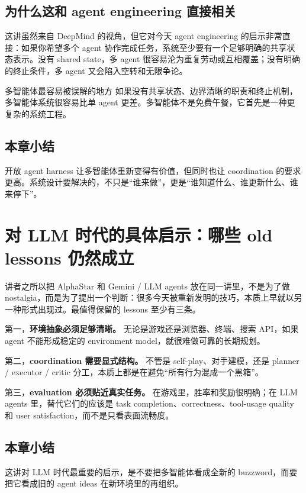 \documentclass[a4paper]{article}
\begin{document}
\subsection{为什么这和 agent engineering 直接相关}
这讲虽然来自 DeepMind 的视角，但它对今天 agent engineering 的启示非常直接：如果你希望多个 agent 协作完成任务，系统至少要有一个足够明确的共享状态表示。没有 shared state，多 agent 很容易沦为重复劳动或互相覆盖；没有明确的终止条件，多 agent 又会陷入空转和无限争论。

\begin{warningbox}{多智能体最容易被误解的地方}
如果没有共享状态、边界清晰的职责和终止机制，多智能体系统很容易比单 agent 更差。多智能体不是免费午餐，它首先是一种更复杂的系统工程。
\end{warningbox}

\subsection{本章小结}
开放 agent harness 让多智能体重新变得有价值，但同时也让 coordination 的要求更高。系统设计要解决的，不只是“谁来做”，更是“谁知道什么、谁更新什么、谁来停下”。

\section{对 LLM 时代的具体启示：哪些 old lessons 仍然成立}
讲者之所以把 AlphaStar 和 Gemini / LLM agents 放在同一讲里，不是为了做 nostalgia，而是为了提出一个判断：很多今天被重新发明的技巧，本质上早就以另一种形式出现过。最值得保留的 lessons 至少有三条。

第一，\textbf{环境抽象必须足够清晰。} 无论是游戏还是浏览器、终端、搜索 API，如果 agent 不能形成稳定的 environment model，就很难做可靠的长期规划。

第二，\textbf{coordination 需要显式结构。} 不管是 self-play、对手建模，还是 planner / executor / critic 分工，本质上都是在避免“所有行为混成一个黑箱”。

第三，\textbf{evaluation 必须贴近真实任务。} 在游戏里，胜率和奖励很明确；在 LLM agents 里，替代它们的应该是 task completion、correctness、tool-usage quality 和 user satisfaction，而不是只看表面流畅度。

\subsection{本章小结}
这讲对 LLM 时代最重要的启示，是不要把多智能体看成全新的 buzzword，而要把它看成旧的 agent ideas 在新环境里的再组织。
\end{document}
